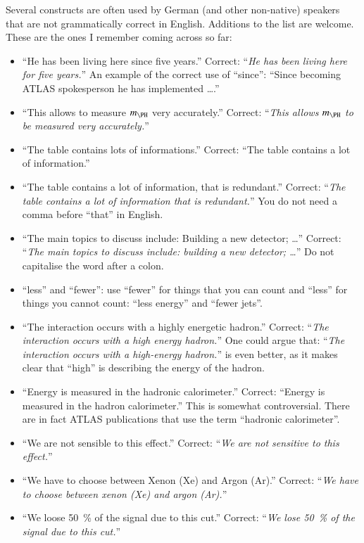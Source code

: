 Several constructs are often used by German (and other non-native) speakers
that are not grammatically correct in English.
Additions to the list are welcome.
These are the ones I remember coming across so far:
\begin{itemize}
\item \enquote{He has been living here since five years.}
  Correct: \enquote{\emph{He has been living here for five years.}}
  An example of the correct use of \enquote{since}:
  \enquote{Since becoming ATLAS spokesperson he has implemented \ldots.}
\item \enquote{This allows to measure $m_{\PH}$ very accurately.}
  Correct: \enquote{\emph{This allows $m_{\PH}$ to be measured very accurately.}}
\item \enquote{The table contains lots of informations.}
  Correct: \enquote{The table contains a lot of information.}
\item \enquote{The table contains a lot of information, that is redundant.}
  Correct: \enquote{\emph{The table contains a lot of information that is redundant.}}
  You do not need a comma before \enquote{that} in English.
\item \enquote{The main topics to discuss include: Building a new detector; \ldots}
  Correct: \enquote{\emph{The main topics to discuss include: building a new detector; \ldots}}
  Do not capitalise the word after a colon.
\item \enquote{less} and \enquote{fewer}: use \enquote{fewer} for things that you can count and
  \enquote{less} for things you cannot count: \enquote{less energy} and \enquote{fewer jets}.
\item \enquote{The interaction occurs with a highly energetic hadron.}
  Correct: \enquote{\emph{The interaction occurs with a high energy hadron.}}
  One could argue that: \enquote{\emph{The interaction occurs with a high-energy hadron.}}
  is even better, as it makes clear that \enquote{high} is describing the energy of the hadron.
\item \enquote{Energy is measured in the hadronic calorimeter.}
  Correct: \enquote{Energy is measured in the hadron calorimeter.}
  This is somewhat controversial.
  There are in fact ATLAS publications that use the term \enquote{hadronic calorimeter}.
\item \enquote{We are not sensible to this effect.}
  Correct: \enquote{\emph{We are not sensitive to this effect.}}
\item \enquote{We have to choose between Xenon (Xe)  and Argon (Ar).}
  Correct: \enquote{\emph{We have to choose between xenon (Xe) and argon (Ar).}}
\item \enquote{We loose \SI{50}{\%} of the signal due to this cut.}
  Correct: \enquote{\emph{We lose \SI{50}{\%} of the signal due to this cut.}}
\end{itemize}

